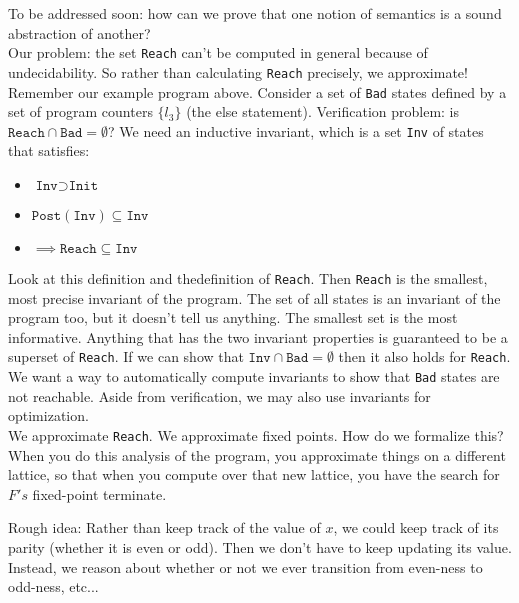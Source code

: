 \documentclass[11pt]{article}
\theoremstyle{definition}
\theoremstyle{plain}
\begin{document}
\noindent To be addressed soon: how can we prove that one notion of semantics is a sound abstraction of another?\\

\noindent Our problem: the set \texttt{Reach} can't be computed in general because of undecidability.
So rather than calculating \texttt{Reach} precisely, we approximate!\\

\noindent Remember our example program above. Consider a set of \texttt{Bad} states defined by a set of program counters $\{l_3\}$ (the else statement). 
Verification problem: is $\texttt{Reach} \cap \texttt{Bad} = \emptyset$? We need an inductive invariant, 
which is a set \texttt{Inv} of states that satisfies:
\begin{itemize}
    \item $\texttt{Inv} \supset \texttt{Init}$
    \item $\texttt{Post}(\texttt{Inv}) \subseteq \texttt{Inv}$
    \item $\implies \texttt{Reach} \subseteq \texttt{Inv}$
\end{itemize}

\noindent Look at this definition and thedefinition of \texttt{Reach}. Then \texttt{Reach} is the smallest, most precise invariant of the program. 
The set of all states is an invariant of the program too, but it doesn't tell us anything. The smallest set is the most informative. 
Anything that has the two invariant properties is guaranteed to be a superset of \texttt{Reach}. 
If we can show that $\texttt{Inv} \cap \texttt{Bad} = \emptyset$ then it also holds for \texttt{Reach}.\\

\noindent We want a way to automatically compute invariants to show that \texttt{Bad} states are not reachable. 
Aside from verification, we may also use invariants for optimization.\\

\noindent We approximate \texttt{Reach}. We approximate fixed points. How do we formalize this? When you do this analysis of the program, 
you approximate things on a different lattice, so that when you compute over that new lattice, you have the search for $F's$ fixed-point terminate.

\noindent Rough idea: Rather than keep track of the value of $x$, we could keep track of its parity (whether it is even or odd). 
Then we don't have to keep updating its value. Instead, we reason about whether or not we ever transition from even-ness to odd-ness, etc...\\
\end{document}
